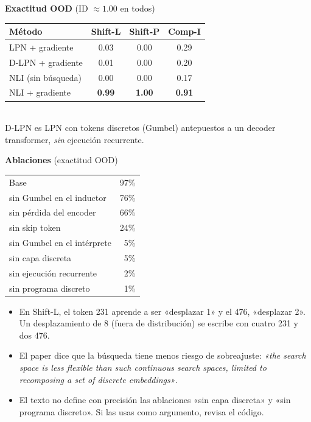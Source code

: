 \documentclass[11pt,a4paper]{article}
\begin{document}
\begin{evidencia}
\small
\begin{minipage}[t]{0.52\linewidth}
\textbf{Exactitud OOD} (ID $\approx1.00$ en todos)\\[2pt]
\begin{tabular}{@{}lccc@{}}
\toprule
Método & Shift-L & Shift-P & Comp-I \\
\midrule
LPN + gradiente & 0.03 & 0.00 & 0.29 \\
D-LPN + gradiente & 0.01 & 0.00 & 0.20 \\
NLI (sin búsqueda) & 0.00 & 0.00 & 0.17 \\
NLI + gradiente & \textbf{0.99} & \textbf{1.00} & \textbf{0.91} \\
\bottomrule
\end{tabular}\\[3pt]
D-LPN es LPN con tokens discretos (Gumbel) antepuestos a un decoder transformer, \emph{sin} ejecución recurrente.
\end{minipage}\hfill
\begin{minipage}[t]{0.44\linewidth}
\textbf{Ablaciones} (exactitud OOD)\\[2pt]
\begin{tabular}{@{}lr@{}}
\toprule
Base & 97\% \\
sin Gumbel en el inductor & 76\% \\
sin pérdida del encoder & 66\% \\
sin skip token & 24\% \\
sin Gumbel en el intérprete & 5\% \\
sin capa discreta & 5\% \\
sin ejecución recurrente & 2\% \\
sin programa discreto & 1\% \\
\bottomrule
\end{tabular}
\end{minipage}
\par\smallskip
\begin{itemize}[leftmargin=*]
  \item En Shift-L, el token 231 aprende a ser «desplazar 1» y el 476, «desplazar 2». Un desplazamiento de 8 (fuera de distribución) se escribe con cuatro 231 y dos 476.
  \item El paper dice que la búsqueda tiene menos riesgo de sobreajuste: \emph{«the search space is less flexible than such continuous search spaces, limited to recomposing a set of discrete embeddings»}.
  \item El texto no define con precisión las ablaciones «sin capa discreta» y «sin programa discreto». Si las usas como argumento, revisa el código.
\end{itemize}
\end{evidencia}
\end{document}
